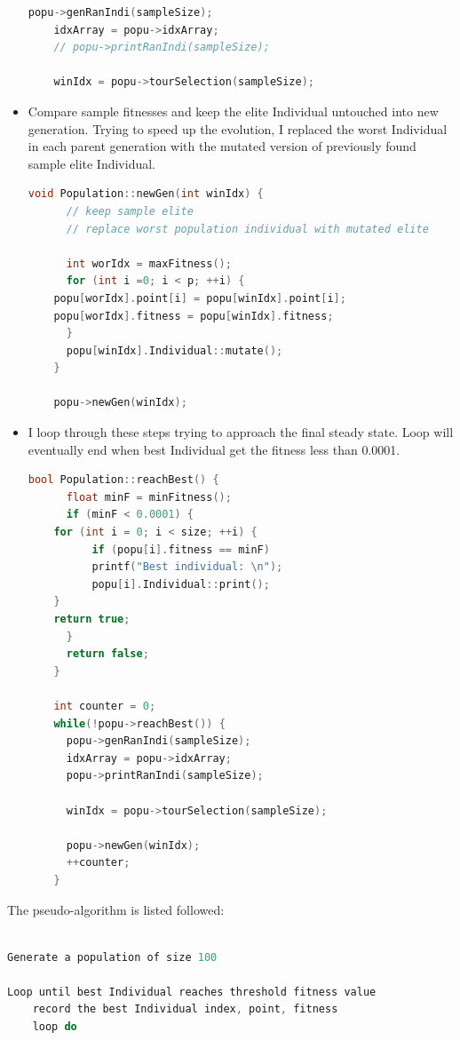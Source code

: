 \documentclass{article}
\begin{document}
\begin{CJK}{UTF8}{gbsn}
\begin{itemize}
\begin{lstlisting}[language=c++]
    popu->genRanIndi(sampleSize);
    idxArray = popu->idxArray;
    // popu->printRanIndi(sampleSize);
    
    winIdx = popu->tourSelection(sampleSize);
  \end{lstlisting}

\item Compare sample fitnesses and keep the elite Individual untouched into new generation. Trying to speed up the evolution, I replaced the worst Individual in each parent generation with the mutated version of previously found sample elite Individual. 
  \begin{lstlisting}[language=c++]
    void Population::newGen(int winIdx) {
      // keep sample elite
      // replace worst population individual with mutated elite

      int worIdx = maxFitness();
      for (int i =0; i < p; ++i) {
	popu[worIdx].point[i] = popu[winIdx].point[i];
	popu[worIdx].fitness = popu[winIdx].fitness;
      }
      popu[winIdx].Individual::mutate();
    }

    popu->newGen(winIdx);
  \end{lstlisting}

\item I loop through these steps trying to approach the final steady state. Loop will eventually end when best Individual get the fitness less than 0.0001.
  \begin{lstlisting}[language=c++]
    bool Population::reachBest() {
      float minF = minFitness();
      if (minF < 0.0001) {
	for (int i = 0; i < size; ++i) {
          if (popu[i].fitness == minF)
          printf("Best individual: \n");
          popu[i].Individual::print();
	}
	return true;
      }
      return false;
    }

    int counter = 0;
    while(!popu->reachBest()) {
      popu->genRanIndi(sampleSize);
      idxArray = popu->idxArray;
      popu->printRanIndi(sampleSize);
      
      winIdx = popu->tourSelection(sampleSize);

      popu->newGen(winIdx);
      ++counter;
    }
  \end{lstlisting}
\end{itemize}

The pseudo-algorithm is listed followed:  %
\begin{lstlisting}[language=c++]

Generate a population of size 100

Loop until best Individual reaches threshold fitness value
    record the best Individual index, point, fitness
    loop do


\end{lstlisting}
\end{CJK}
\end{document}
